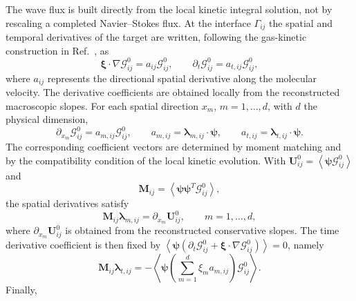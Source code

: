 \documentclass[preprint,12pt]{elsarticle}
\begin{document}
The wave flux is built directly from the local kinetic integral solution, not by rescaling a completed Navier--Stokes flux. At the interface $\Gamma_{ij}$ the spatial and temporal derivatives of the target are written, following the gas-kinetic construction in Ref.~\cite{xu2001gks}, as
\begin{equation}\label{eq:gks_A_definition}
    \boldsymbol{\xi}\cdot\nabla\mathcal{G}_{ij}^{0}=a_{ij}\mathcal{G}_{ij}^{0},
    \qquad
    \partial_t\mathcal{G}_{ij}^{0}=a_{t,ij}\mathcal{G}_{ij}^{0},
\end{equation}
where $a_{ij}$ represents the directional spatial derivative along the molecular velocity. The derivative coefficients are obtained locally from the reconstructed macroscopic slopes. For each spatial direction $x_m$, $m=1,\ldots,d$, with $d$ the physical dimension,
\begin{equation}\label{eq:gks_derivative_basis}
    \partial_{x_m}\mathcal{G}_{ij}^{0}
    =
    a_{m,ij}\mathcal{G}_{ij}^{0},
    \qquad
    a_{m,ij}=\boldsymbol{\lambda}_{m,ij}\cdot\boldsymbol{\psi},
    \qquad
    a_{t,ij}=\boldsymbol{\lambda}_{t,ij}\cdot\boldsymbol{\psi}.
\end{equation}
The corresponding coefficient vectors are determined by moment matching and by the compatibility condition of the local kinetic evolution. With $\mathbf U_{ij}^{0}=\left\langle\boldsymbol{\psi}\mathcal{G}_{ij}^{0}\right\rangle$ and
\[
    \mathbf M_{ij}
    =
    \left\langle
    \boldsymbol{\psi}\boldsymbol{\psi}^{T}\mathcal{G}_{ij}^{0}
    \right\rangle ,
\]
the spatial derivatives satisfy
\begin{equation}\label{eq:gks_spatial_derivative_coefficients}
    \mathbf M_{ij}\boldsymbol{\lambda}_{m,ij}
    =
    \partial_{x_m}\mathbf U_{ij}^{0},
    \qquad m=1,\ldots,d,
\end{equation}
where $\partial_{x_m}\mathbf U_{ij}^{0}$ is obtained from the reconstructed conservative slopes. The time derivative coefficient is then fixed by
$\left\langle\boldsymbol{\psi}(\partial_t\mathcal{G}_{ij}^{0}+\boldsymbol{\xi}\cdot\nabla\mathcal{G}_{ij}^{0})\right\rangle=0$, namely
\begin{equation}\label{eq:gks_derivative_coefficients}
    \mathbf M_{ij}\boldsymbol{\lambda}_{t,ij}
    =
    -\left\langle
    \boldsymbol{\psi}
    \left(\sum_{m=1}^{d}\xi_m a_{m,ij}\right)
    \mathcal{G}_{ij}^{0}
    \right\rangle .
\end{equation}
Finally,
\end{document}
